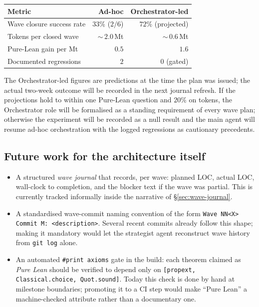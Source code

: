 \documentclass[11pt,a4paper]{article}
\newcommand{\cmd}[1]{\texttt{\small #1}}
\theoremstyle{plain}
\theoremstyle{definition}
\begin{document}
\begin{center}
\renewcommand{\arraystretch}{1.15}
\begin{tabular}{lrr}
\toprule
\textbf{Metric} & \textbf{Ad-hoc} & \textbf{Orchestrator-led} \\
\midrule
Wave closure success rate & $33\%$ ($2/6$) & $72\%$ (projected) \\
Tokens per closed wave      & ${\sim}\,2.0$\,Mt & ${\sim}\,0.6$\,Mt \\
Pure-Lean gain per Mt       & $0.5$ & $1.6$ \\
Documented regressions      & $2$ & $0$ (gated) \\
\bottomrule
\end{tabular}
\end{center}

The Orchestrator-led figures are predictions at the time the plan was
issued; the actual two-week outcome will be recorded in the next
journal refresh. If the projections hold to within one Pure-Lean
question and $20\%$ on tokens, the Orchestrator role will be
formalised as a standing requirement of every wave plan; otherwise
the experiment will be recorded as a null result and the main agent
will resume ad-hoc orchestration with the logged regressions as
cautionary precedents.

\subsection{Future work for the architecture itself}

\begin{itemize}[leftmargin=1.3em]
  \item A structured \emph{wave journal} that records, per wave:
        planned LOC, actual LOC, wall-clock to completion, and the
        blocker text if the wave was partial. This is currently
        tracked informally inside the narrative of
        \S\ref{sec:wave-journal}.
  \item A standardised wave-commit naming convention of the form
        \cmd{Wave NN<X> Commit M: <description>}. Several recent
        commits already follow this shape; making it mandatory would
        let the strategist agent reconstruct wave history from
        \cmd{git log} alone.
  \item An automated \cmd{\#print axioms} gate in the build: each
        theorem claimed as \emph{Pure Lean} should be verified to
        depend only on \cmd{[propext, Classical.choice, Quot.sound]}.
        Today this check is done by hand at milestone boundaries;
        promoting it to a CI step would make ``Pure Lean'' a
        machine-checked attribute rather than a documentary one.
\end{itemize}
\end{document}
